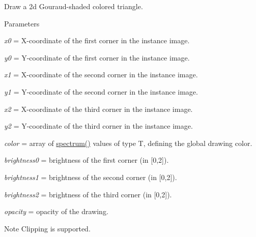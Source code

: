 Draw a 2d Gouraud-\/shaded colored triangle. 


\begin{DoxyParams}{Parameters}
\item[{\em x0}]= X-\/coordinate of the first corner in the instance image. \item[{\em y0}]= Y-\/coordinate of the first corner in the instance image. \item[{\em x1}]= X-\/coordinate of the second corner in the instance image. \item[{\em y1}]= Y-\/coordinate of the second corner in the instance image. \item[{\em x2}]= X-\/coordinate of the third corner in the instance image. \item[{\em y2}]= Y-\/coordinate of the third corner in the instance image. \item[{\em color}]= array of \hyperlink{structcimg__library_1_1CImg_acd2ee207fa512e34b45ff548082f70ba}{spectrum()} values of type {\ttfamily T}, defining the global drawing color. \item[{\em brightness0}]= brightness of the first corner (in \mbox{[}0,2\mbox{]}). \item[{\em brightness1}]= brightness of the second corner (in \mbox{[}0,2\mbox{]}). \item[{\em brightness2}]= brightness of the third corner (in \mbox{[}0,2\mbox{]}). \item[{\em opacity}]= opacity of the drawing. \end{DoxyParams}
\begin{DoxyNote}{Note}
Clipping is supported. 
\end{DoxyNote}
